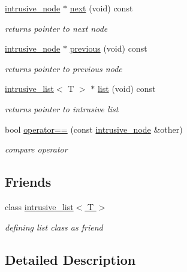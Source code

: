 \begin{DoxyCompactItemize}
\hyperlink{classcrap_1_1intrusive__node}{intrusive\+\_\+node} $\ast$ \hyperlink{classcrap_1_1intrusive__node_a284c8a3480e6e5195633b01d90abf85d}{next} (void) const 
\begin{DoxyCompactList}\small\item\em returns pointer to next node \end{DoxyCompactList}\item 
\hyperlink{classcrap_1_1intrusive__node}{intrusive\+\_\+node} $\ast$ \hyperlink{classcrap_1_1intrusive__node_a366a5d51e32c3d204d229dd36785495b}{previous} (void) const 
\begin{DoxyCompactList}\small\item\em returns pointer to previous node \end{DoxyCompactList}\item 
\hyperlink{classcrap_1_1intrusive__list}{intrusive\+\_\+list}$<$ T $>$ $\ast$ \hyperlink{classcrap_1_1intrusive__node_abfef045836dcfefba5c5189267d0cedd}{list} (void) const 
\begin{DoxyCompactList}\small\item\em returns pointer to intrusive list \end{DoxyCompactList}\item 
bool \hyperlink{classcrap_1_1intrusive__node_a03a03db2b8ce66d8f3a609ac432bcb87}{operator==} (const \hyperlink{classcrap_1_1intrusive__node}{intrusive\+\_\+node} \&other)
\begin{DoxyCompactList}\small\item\em compare operator \end{DoxyCompactList}\end{DoxyCompactItemize}
\subsection*{Friends}
\begin{DoxyCompactItemize}
\item 
class \hyperlink{classcrap_1_1intrusive__node_a8abfe7a49da2ca301723ee176edb482f}{intrusive\+\_\+list$<$ T $>$}
\begin{DoxyCompactList}\small\item\em defining list class as friend \end{DoxyCompactList}\end{DoxyCompactItemize}


\subsection{Detailed Description}
